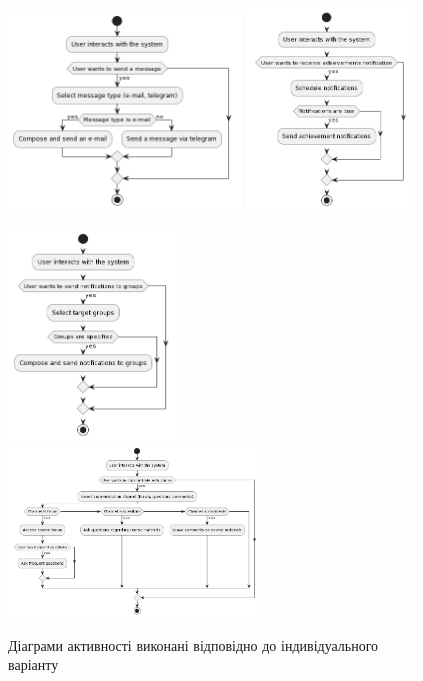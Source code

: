 \documentclass[oneside,14pt]{extarticle}
\begin{document}
\begin{normalsize}
	\begin{figure}[H]
		\centering
		\includegraphics[width=0.55\textwidth]{activity1}\hfill
		\includegraphics[width=0.4\textwidth]{activity2}\par
		\vspace{0.5cm}
		\includegraphics[width=0.4\textwidth]{activity3}\hfill
		\includegraphics[width=0.6\textwidth]{activity4}\par
		\caption{Діаграми активності виконані відповідно до індивідуального варіанту}
	\end{figure}
	

\end{normalsize}
\end{document}
